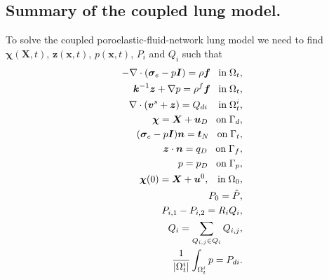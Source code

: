 \subsection{Summary of the coupled lung model.}
\label{section:model_eqn_summary}
To solve the coupled poroelastic-fluid-network lung model we need to find $\boldsymbol{\chi}(\boldsymbol{X},t)$,  $\boldsymbol{z}(\boldsymbol{x},t)$, $p(\boldsymbol{x},t)$, $P_{i}$ and $Q_{i}$ such that
\begin{subequations}
\begin{align}
\label{eqn:mixture_momentum_reform_full}
-\nabla \cdot( \boldsymbol{\sigma}_{e} -p\boldsymbol{I}) = \rho\boldsymbol{f} \;\;\; \mbox{in} \; \Omega_{t},\\
\label{eqn:fluid_momentum_reform_full}
{\perm^{-1}\boldsymbol{z}} + \nabla p =  \rho^{f}\boldsymbol{f} \;\;\; \mbox{in} \; \Omega_{t}, \\
\label{eqn:mixture_mass_reform_full}
 \nabla \cdot ( \boldsymbol{v}^{s} + \boldsymbol{z}) = Q_{di} \;\;\;\; \mbox{in}\;\Omega_{t}^{i},\\
\boldsymbol{\chi} =\boldsymbol{X}+\boldsymbol{u}_{D}   \;\;\; \mbox{on}\; \Gamma_{d},
\\
(\boldsymbol{\sigma}_{e}-p\boldsymbol{I})\boldsymbol{n} = \boldsymbol{t}_{N}   \;\;\; \mbox{on}\; \Gamma_{t},
\\
\boldsymbol{z} \cdot \boldsymbol{n} = {q_{D}}   \;\;\; \mbox{on}\; \Gamma_{f},
\\
p = p_{D}   \;\;\; \mbox{on}\; \Gamma_{p},
\\
\boldsymbol{\chi}(0) = \boldsymbol{X} + \boldsymbol{u}^{0},   \;\;\;  \mbox{in}\;\Omega_{0},\\ %
\label{eqn:tree_pressure_bc}
P_{0}=\hat{P},\\
\label{eqn:tree_flow}
  P_{i,1} - P_{i,2} = R_{i} Q_{i},\\
  \label{eqn:tree_mass}
Q_{i}  = \sum_{Q_{i,j} \in Q_{i}} Q_{i,j},\\
  \label{eqn:pressure_coupling}
\frac{1}{|\Omega_{t}^{i}|} \int_{\Omega_{t}^{i}} p = P_{di}.
\end{align}
\label{eqn:full_model}
\end{subequations}
%
